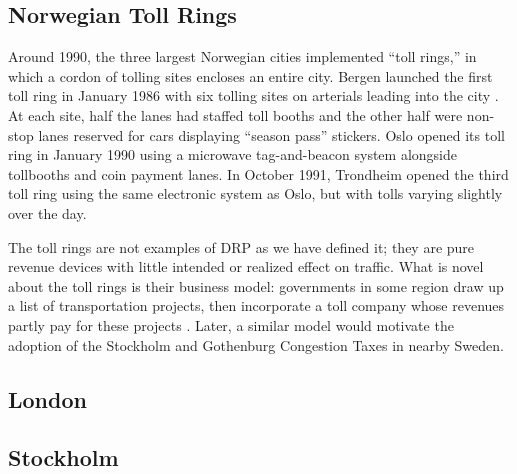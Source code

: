 \subsection{Norwegian Toll Rings}

Around 1990, the three largest Norwegian cities implemented ``toll rings,'' in which a cordon of tolling sites encloses an entire city. Bergen launched the first toll ring in January 1986 with six tolling sites on arterials leading into the city \citep{Ieromonachou2006,Ramjerdi2004}. At each site, half the lanes had staffed toll booths and the other half were non-stop lanes reserved for cars displaying ``season pass'' stickers. Oslo opened its toll ring in January 1990 using a microwave tag-and-beacon system alongside tollbooths and coin payment lanes. In October 1991, Trondheim opened the third toll ring using the same electronic system as Oslo, but with tolls varying slightly over the day.

The toll rings are not examples of DRP as we have defined it; they are pure revenue devices with little intended or realized effect on traffic. What is novel about the toll rings is their business model: governments in some region draw up a list of transportation projects, then incorporate a toll company whose revenues partly pay for these projects \citep{Ieromonachou2006}. Later, a similar model would motivate the adoption of the Stockholm and Gothenburg Congestion Taxes in nearby Sweden.

 \subsection{London}

 \subsection{Stockholm}
